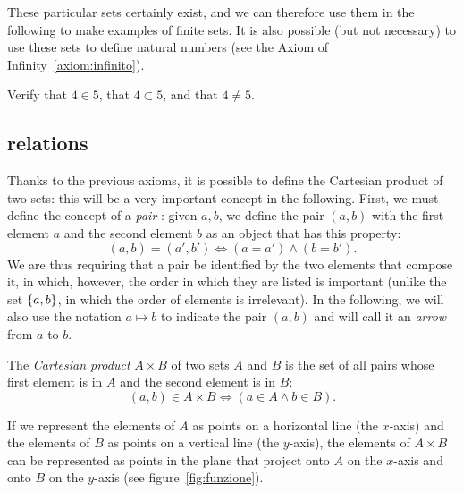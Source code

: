 These particular sets certainly exist, and we can therefore use them in the
following to make examples of finite sets. It is also possible (but not
necessary) to use these sets to define natural numbers (see the Axiom of
Infinity~\ref{axiom:infinito}).

\begin{exercise}
Verify that $4\in 5$, 
that $4\subset 5$, 
and that $4\neq 5$.
\end{exercise}

\subsection{relations}

Thanks to the previous axioms, it is possible to define the Cartesian product of
two sets: this will be a very important concept in the following. First, we must
define the concept of a \emph{pair}%
%
: given
$a,b$, we define the pair $(a,b)$ with the first element $a$ and the second
element $b$ as an object that has this property:%
%
\begin{equation}\label{eq:coppia}
  (a, b) = (a', b') \iff (a=a') \land (b=b').
\end{equation}
We are thus requiring that a pair be identified by the two elements that compose
it, in which, however, the order in which they are listed is important (unlike
the set ${\left\{ a,b \right\}}$, in which the order of elements is irrelevant). In the
following, we will also use the notation $a \mapsto b$ to indicate the pair
$(a,b)$ and will call it an \emph{arrow}%
%
 from $a$ to $b$.

The \emph{Cartesian product} $A\times B$ of two sets $A$ and $B$ is the set of
all pairs whose first element is in $A$ and the second element is in $B$:
\[
  (a, b) \in A \times B \iff (a\in A \land b\in B).
\]

If we represent the elements of $A$ as points on a horizontal line (the
$x$-axis) and the elements of $B$ as points on a vertical line (the $y$-axis),
the elements of $A\times B$ can be represented as points in the plane that
project onto $A$ on the $x$-axis and onto $B$ on the $y$-axis (see
figure~\ref{fig:funzione}).
  
